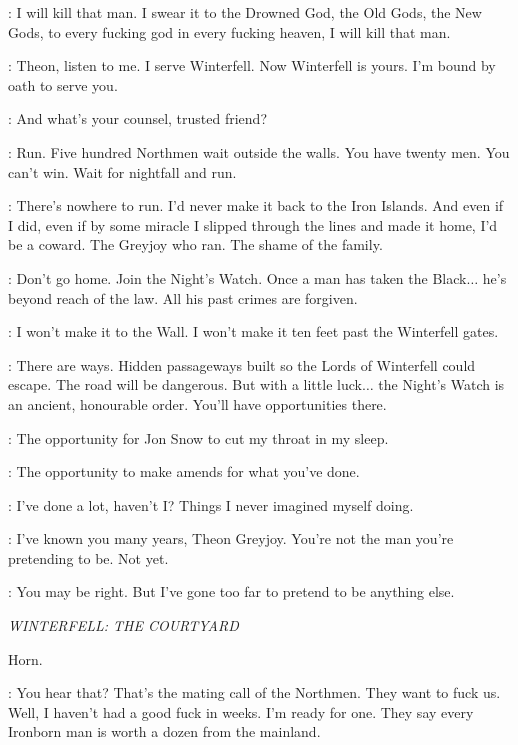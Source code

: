 
\THEON: I will kill that man. I swear it to the Drowned God, the Old Gods, the New Gods, to every fucking god in every fucking heaven, I will kill that man. 

\LUWIN: Theon, listen to me. I serve Winterfell. Now Winterfell is yours. I'm bound by oath to serve you. 

\THEON: And what's your counsel, trusted friend? 

\LUWIN: Run. Five hundred Northmen wait outside the walls. You have twenty men. You can't win. Wait for nightfall and run. 

\THEON: There's nowhere to run. I'd never make it back to the Iron Islands. And even if I did, even if by some miracle I slipped through the lines and made it home, I'd be a coward. The Greyjoy who ran. The shame of the family. 

\LUWIN: Don't go home. Join the Night's Watch. Once a man has taken the Black$\ldots$ he's beyond reach of the law. All his past crimes are forgiven. 

\THEON: I won't make it to the Wall. I won't make it ten feet past the Winterfell gates. 

\LUWIN: There are ways. Hidden passageways built so the Lords of Winterfell could escape. The road will be dangerous. But with a little luck$\ldots$ the Night's Watch is an ancient, honourable order. You'll have opportunities there. 

\THEON: The opportunity for Jon Snow to cut my throat in my sleep. 

\LUWIN: The opportunity to make amends for what you've done. 

\THEON: I've done a lot, haven't I? Things I never imagined myself doing. 

\LUWIN:  I've known you many years, Theon Greyjoy. You're not the man you're pretending to be. Not yet. 

\THEON: You may be right. But I've gone too far to pretend to be anything else. 


\scene

\textit{WINTERFELL: THE COURTYARD} 

\sfx Horn.


\THEON: You hear that? That's the mating call of the Northmen. They want to fuck us. Well, I haven't had a good fuck in weeks. I'm ready for one.  They say every Ironborn man is worth a dozen from the mainland. 

